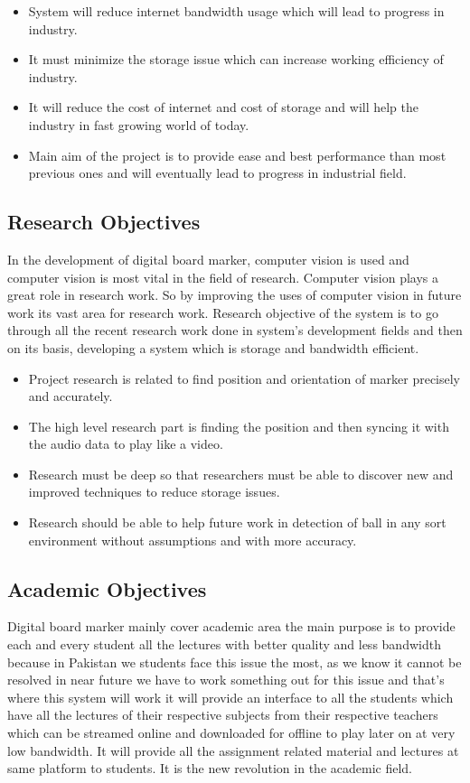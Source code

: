 \begin{itemize}

\item System will reduce internet bandwidth usage which 
will lead to progress in industry.
\item It must minimize the storage issue which can increase working efficiency of industry.
\item It will reduce the cost of internet and cost of storage and will help the industry in fast growing world of today.
\item Main aim of the project is to provide ease and best performance than most previous ones and will eventually lead to progress in industrial field.

\end{itemize}

\subsection{Research Objectives}
In the development of digital board marker, computer vision is used and computer vision is most vital in the field of research. Computer vision plays a great role in research work. So by improving the uses of computer vision in future work its vast area for research work.
Research objective of the system is to go through all the recent research work done in system's development fields and then on its basis, developing a system which is storage and bandwidth efficient.

\begin{itemize}

\item Project research is related to find position and orientation of marker precisely and accurately.
\item The high level research part is finding the position and then syncing it with the audio data to play like a video.
\item Research must be deep so that researchers must be able to discover new and improved techniques to reduce storage issues.
\item Research should be able to help future work in detection of ball in any sort environment without assumptions and with more accuracy.

\end{itemize}

\subsection{Academic Objectives}
Digital board marker mainly cover academic area the main purpose is to provide each and every student all the lectures with better quality and less bandwidth because in Pakistan we students face this issue the most, as we know it cannot be resolved in near future we have to work something out for this issue and that's where this system will work it will provide an interface to all the students which have all the lectures of their respective subjects from their respective teachers which can be streamed online and downloaded for offline to play later on at very low bandwidth. It will provide all the assignment related material and lectures at same platform to students. It is the new revolution in the academic field.

